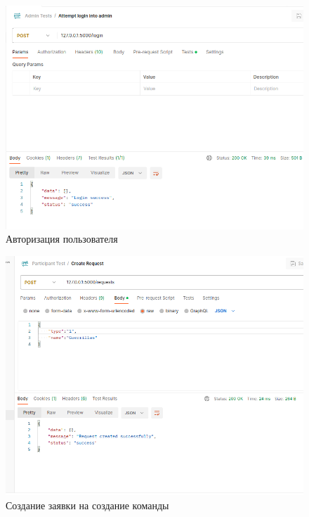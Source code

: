 \begin{figure}[H]
	\begin{center}
		\includegraphics[page=1,scale=0.5]{assets/ex-signin.png}
	\end{center}
	\caption{Авторизация пользователя}
	\label{ex-signin}
\end{figure}

\begin{figure}[H]
	\begin{center}
		\includegraphics[page=1,scale=0.5]{assets/ex-create.png}
	\end{center}
	\caption{Создание заявки на создание команды}
	\label{ex-create}
\end{figure}

